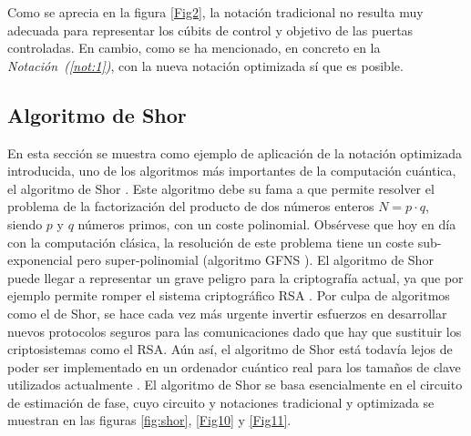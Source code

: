 \documentclass[10pt,conference,a4paper]{IEEEtran}
\begin{document}
    Como se aprecia en la figura \ref{Fig2}, la notación tradicional   no resulta muy adecuada para  representar los cúbits de control y objetivo de las puertas controladas. En cambio, como   se ha mencionado, en concreto en la {\it Notación~(\ref{not:1})}, con la nueva notación optimizada sí que es posible.%

    \subsection{Algoritmo de Shor}
    En esta sección se muestra como ejemplo de aplicación de la notación optimizada introducida, uno de los algoritmos más  importantes de la computación cuántica, el algoritmo de Shor \cite{Shor}. Este algoritmo debe su fama a que permite resolver el problema de la factorización del producto de dos números enteros  $N=p\cdot q$, siendo $p$ y $q$  números primos, con un coste polinomial.
    Obsérvese que hoy en día con la computación clásica, la resolución de este problema tiene un coste sub-exponencial pero super-polinomial (algoritmo GFNS \cite{GNFS} \cite{GNFS_book}).
    El algoritmo de Shor puede llegar a representar un grave peligro para la criptografía actual, ya que por ejemplo permite romper el sistema criptográfico RSA \cite{attack_RSA}. Por culpa de algoritmos como el de Shor, se hace cada vez más urgente invertir esfuerzos  en desarrollar nuevos protocolos seguros para las comunicaciones dado que hay que sustituir los criptosistemas como el RSA. Aún así, el algoritmo de Shor está todavía lejos de poder ser implementado en un ordenador cuántico real para los tamaños de clave utilizados actualmente \cite{schnorr} \cite{integer-factoring} \cite{Shor_PD} \cite{Shor_21}.
    El algoritmo de Shor se basa esencialmente en el circuito de estimación de fase, cuyo circuito y notaciones tradicional y optimizada se muestran en las figuras \ref{fig:shor}, \ref{Fig10} y \ref{Fig11}.
\end{document}
